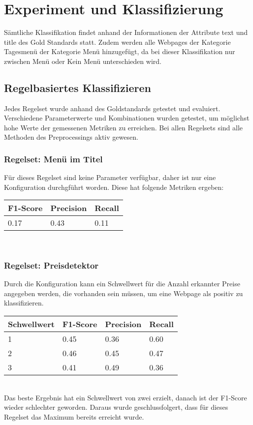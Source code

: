 \chapter{Experiment und Klassifizierung}
Sämtliche Klassifikation findet anhand der Informationen der Attribute \glqq text \grqq und \glqq title \grqq des Gold Standards statt.
Zudem werden alle Webpages der Kategorie \glqq Tagesmenü \grqq der Kategorie \glqq Menü \grqq hinzugefügt, da bei dieser Klassifikation nur zwischen \glqq Menü \grqq oder \glqq Kein Menü \grqq unterschieden wird.
\section{Regelbasiertes Klassifizieren}
Jedes Regelset wurde anhand des Goldstandards getestet und evaluiert.
Verschiedene Parameterwerte und Kombinationen wurden getestet, um möglichst hohe Werte der gemessenen Metriken zu erreichen.
Bei allen Regelsets sind alle Methoden des Preprocessings aktiv gewesen. 
\subsection{Regelset: Menü im Titel}
Für dieses Regelset sind keine Parameter verfügbar, daher ist nur eine Konfiguration durchgführt worden.
Diese hat folgende Metriken ergeben:\\
\begin{tabular}{|l|l|l|}
	\hline
	F1-Score & Precision & Recall\\
	\hline
	0.17 & 0.43 & 0.11  \\
	\hline
\end{tabular}\\
\subsection{Regelset: Preisdetektor}
Durch die Konfiguration kann ein Schwellwert für die Anzahl erkannter Preise angegeben werden, die vorhanden sein müssen, um eine Webpage als positiv zu klassifizieren.\\
\begin{tabular}{|l|l|l|l|}
	\hline
	Schwellwert & F1-Score & Precision & Recall\\
	\hline
	1 & 0.45 & 0.36 & 0.60  \\
	2 & 0.46 & 0.45 & 0.47 \\
	3 & 0.41 & 0.49 & 0.36 \\
	\hline
\end{tabular}\\
Das beste Ergebnis hat ein Schwellwert von zwei erzielt, danach ist der F1-Score wieder schlechter geworden.
Daraus wurde geschlussfolgert, dass für dieses Regelset das Maximum bereits erreicht wurde.
